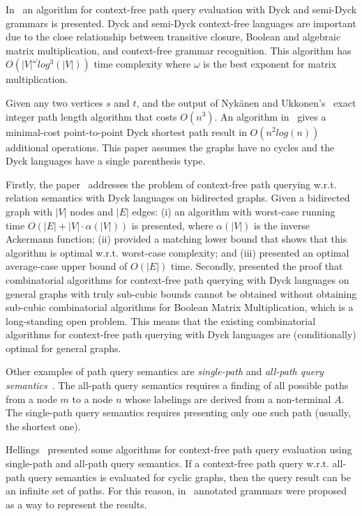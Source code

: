 In~\cite{bradford2017efficient} an algorithm for context-free path query evaluation with Dyck and semi-Dyck grammars is presented. Dyck and semi-Dyck context-free languages are important due to the close relationship between transitive closure, Boolean and algebraic matrix multiplication, and context-free grammar recognition. This algorithm has $O(|V|^{\omega}log^3(|V|))$ time complexity where $\omega$ is the best exponent for matrix multiplication.

Given any two vertices $s$ and $t$, and the output of Nyk\"anen and Ukkonen's~\cite{nykanen2002exact} exact integer path length algorithm that costs $O(n^3)$. An algorithm in~\cite{bradford2016fast} gives a minimal-cost point-to-point Dyck shortest path result in $O(n^2 log(n))$ additional operations. This paper assumes the graphs have no cycles and the Dyck languages have a single parenthesis type.

Firstly, the paper~\cite{chatterjee2017optimal} addresses the problem of context-free path querying w.r.t. relation semantics with Dyck languages on bidirected graphs. Given a bidirected graph with $|V|$ nodes and $|E|$ edges: (i) an algorithm with worst-case running time $O(|E| + |V| \cdot \alpha(|V|))$ is presented, where $\alpha(|V|)$ is the inverse Ackermann function; (ii) provided a matching lower bound that shows that this algorithm is optimal w.r.t. worst-case complexity; and (iii) presented an optimal average-case upper bound of $O(|E|)$ time. Secondly, presented the proof that combinatorial algorithms for context-free path querying with Dyck languages on general graphs with truly sub-cubic bounds cannot be obtained without obtaining sub-cubic combinatorial algorithms for Boolean Matrix Multiplication, which is a long-standing open problem. This means that the existing combinatorial algorithms for context-free path querying with Dyck languages are (conditionally) optimal for general graphs.

Other examples of path query semantics are \emph{single-path} and \emph{all-path query semantics}~\cite{hellingsPathQuerying}. The all-path query semantics requires a finding of all possible paths from a node $m$ to a node $n$ whose labelings are derived from a non-terminal $A$. The single-path query semantics requires presenting only one such path (usually, the shortest one). 

Hellings~\cite{hellingsPathQuerying} presented some algorithms for context-free path query evaluation using single-path and all-path query semantics. If a context-free path query w.r.t. all-path query semantics is evaluated for cyclic graphs, then the query result can be an infinite set of paths. For this reason, in~\cite{hellingsPathQuerying} annotated grammars were proposed as a way to represent the results.

